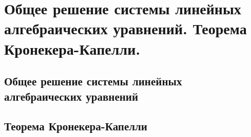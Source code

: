 \chapter{Общее решение системы линейных алгебраических уравнений. Теорема Кронекера-Капелли.}
\section{Общее решение системы линейных алгебраических уравнений}
\section{Теорема Кронекера-Капелли}
